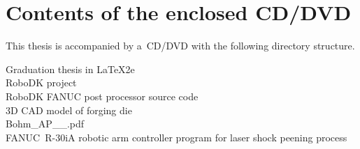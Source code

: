 ﻿\chapter{Contents of the enclosed CD/DVD \label{ch:ApendCD}}

This thesis is accompanied by a~CD/DVD with the following directory structure.

\begin{description}

    \item[Graduation thesis in \LaTeX2e] 
            
    \item[RoboDK project] 

    \item[RoboDK FANUC post processor source code] 

    \item[3D CAD model of forging die] 

    \item[Bohm\_AP\_\the\value{YearOld}\_\Year.pdf] 
     
     \item[FANUC~R-30iA robotic arm controller program for laser shock peening process]

\end{description}

